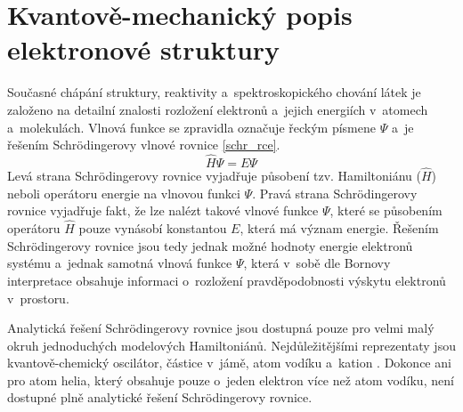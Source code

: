 \documentclass[
digital, %
table,   %
nolof,     %
nolot,     %
oneside,
]{fithesis3}
\begin{document}
\section{Kvantově-mechanický popis elektronové struktury}
Současné chápání struktury, reaktivity a~spektroskopického chování látek je založeno na detailní znalosti rozložení elektronů a~jejich energiích v~atomech a~molekulách. Vlnová funkce se zpravidla označuje řeckým písmene $\Psi$ a~je řešením Schrödingerovy vlnové rovnice \ref{schr_rce}.
\begin{equation}
\widehat{H} \Psi = E \Psi
\label{schr_rce}
\end{equation}
Levá strana Schrödingerovy rovnice vyjadřuje působení tzv. Hamiltoniánu ($\widehat{H}$) neboli operátoru energie na vlnovou funkci $\Psi$. Pravá strana Schrödingerovy rovnice vyjadřuje fakt, že lze nalézt takové vlnové funkce $\Psi$, které se působením operátoru $\widehat{H}$ pouze vynásobí konstantou $E$, která má význam energie. Řešením Schrödingerovy rovnice jsou tedy jednak možné hodnoty energie elektronů systému a~jednak samotná vlnová funkce $\Psi$, která v~sobě dle Bornovy interpretace obsahuje informaci o~rozložení pravděpodobnosti výskytu elektronů v~prostoru.

Analytická řešení Schrödingerovy rovnice jsou dostupná pouze pro velmi malý okruh jednoduchých modelových Hamiltoniánů. Nejdůležitějšími reprezentaty jsou kvantově-chemický oscilátor, částice v~jámě, atom vodíku a~kation . Dokonce ani pro atom helia, který obsahuje pouze o~jeden elektron více než atom vodíku, není dostupné plně analytické řešení Schrödingerovy rovnice.
\end{document}
